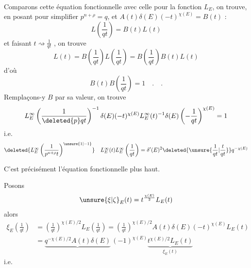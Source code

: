 Comparons cette équation fonctionnelle avec celle pour la fonction $L_E$, on trouve, en  posant pour simplifier $p^{n+\rho}=q$, et $A(t)\delta(E)(-t)^{\chi(E)}=B(t)$ :
\[
 L\left(\frac{1}{qt}\right)=B(t)L(t)
\]
et faisant $t\rightsquigarrow\frac{1}{qt}$ , on trouve
\[
 L(t)=B\left(\frac{1}{qt}\right)L\left(\frac{1}{qt}\right)
      =B\left(\frac{1}{qt}\right)B(t)L(t)
\]
d'où
\[
 B(t)B\left(\frac{1}{qt}\right)=1\quad .\quad .
\]
Remplaçons-y $B$ par sa valeur, on trouve
\[
 L_E^\infty\left(\frac{1}{\deleted{p}qt}\right)^{-1}
 \delta(E)(-t)^{\chi(E)}L_E^\infty(t)^{-1}\delta(E)
 \left(-\frac{1}{qt}\right)^{\chi(E)}=1
\]
i.e.
\[
 \deleted{L_E^\infty\left(\frac{1}{p^{n+\rho}t}\right)^{\unsure{1|-1}}}
 \quad L_E^\infty(t)L_E^\infty\left(\frac{1}{qt}\right)
 =\delta'(E)^2\deleted{\unsure{\frac{1}{qt}|\frac{t}{qt}}}q^{-\chi(E)}
\]

C'est précisément l'équation fonctionnelle  plus haut.

Posons
\[
 \unsure{\xi|\zeta}_E(t)=t^{\frac{\chi(E)}{2}}L_E(t)
\]
alors
\[
 \begin{aligned}
 \xi_E\left(\frac{1}{qt}\right)&=\left(\frac{1}{qt}\right)^{\chi(E)/2}
 L_E\left(\frac{1}{qt}\right)=\left(\frac{1}{qt}\right)^{\chi(E)/2}
 A(t)\delta(E)(-t)^{\chi(E)}L_E(t)\\
 &=\underbrace{q^{-\chi(E)/2}A(t)\delta(E)}\,(-1)^{\chi(E)}
 \underbrace{t^{\chi(E)/2}L_E(t)}_{\xi_E(t)}
 \end{aligned}
\]
i.e.

